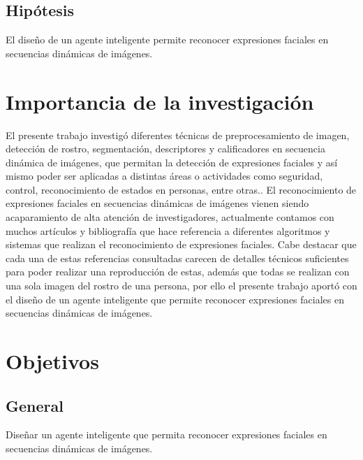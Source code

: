\subsection{Hipótesis}

El diseño de un agente inteligente permite reconocer expresiones faciales en secuencias dinámicas de imágenes.

\section{Importancia de la investigación} 

El presente trabajo investigó diferentes técnicas de preprocesamiento de imagen, detección de rostro, segmentación, descriptores y calificadores en secuencia dinámica de imágenes, que permitan la detección de expresiones faciales y así mismo poder ser aplicadas a distintas áreas o actividades como seguridad, control, reconocimiento de estados en personas, entre otras..
\vskip 0.3cm
El reconocimiento de expresiones faciales en secuencias dinámicas de imágenes vienen siendo acaparamiento de alta atención de investigadores, actualmente contamos con muchos artículos y bibliografía que hace referencia a diferentes algoritmos y sistemas que realizan el reconocimiento de expresiones faciales. Cabe destacar que cada una de estas referencias consultadas carecen de detalles técnicos suficientes para poder realizar una reproducción de estas, además que todas se realizan con una sola imagen del rostro de una persona, por ello el presente trabajo aportó con el diseño de un agente inteligente que permite reconocer expresiones faciales en secuencias dinámicas de imágenes.

\section{Objetivos}

\subsection{General}
Diseñar un agente inteligente que permita reconocer expresiones faciales en secuencias dinámicas de imágenes.


